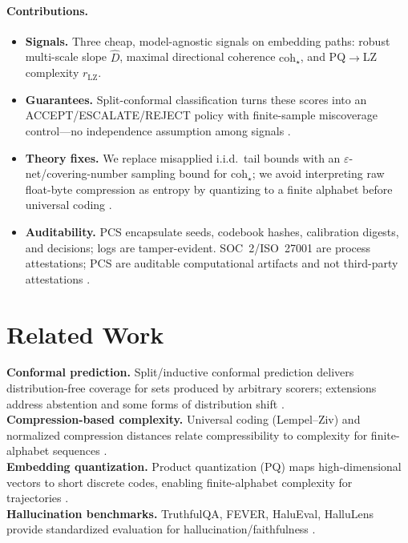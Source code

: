 \documentclass[11pt]{article}
\begin{document}
\paragraph{Contributions.}
\begin{itemize}
  \item \textbf{Signals.} Three cheap, model-agnostic signals on embedding paths: robust multi-scale slope $\hat D$, maximal directional coherence $\mathrm{coh}_\star$, and PQ$\to$LZ complexity $r_{\mathrm{LZ}}$.
  \item \textbf{Guarantees.} Split-conformal classification turns these scores into an \textsc{ACCEPT}/\textsc{ESCALATE}/\textsc{REJECT} policy with finite-sample miscoverage control---no independence assumption among signals \citep{angelopoulos2023gentle,oliveira2024nonexchangeable}.
  \item \textbf{Theory fixes.} We replace misapplied i.i.d.\ tail bounds with an $\varepsilon$-net/covering-number sampling bound for $\mathrm{coh}_\star$; we avoid interpreting raw float-byte compression as entropy by quantizing to a finite alphabet before universal coding \citep{vershynin2018hdp,ziv1978}.
  \item \textbf{Auditability.} PCS encapsulate seeds, codebook hashes, calibration digests, and decisions; logs are tamper-evident. SOC~2/ISO~27001 are process attestations; PCS are auditable computational artifacts and not third-party attestations \citep{aicpa-soc2}.
\end{itemize}

\section{Related Work}
\textbf{Conformal prediction.} Split/inductive conformal prediction delivers distribution-free coverage for sets produced by arbitrary scorers; extensions address abstention and some forms of distribution shift \citep{angelopoulos2023gentle,shafer2008tutorial}.\\
\textbf{Compression-based complexity.} Universal coding (Lempel--Ziv) and normalized compression distances relate compressibility to complexity for finite-alphabet sequences \citep{ziv1978,shannon1948}.\\
\textbf{Embedding quantization.} Product quantization (PQ) maps high-dimensional vectors to short discrete codes, enabling finite-alphabet complexity for trajectories \citep{jegou2011}.\\
\textbf{Hallucination benchmarks.} TruthfulQA, FEVER, HaluEval, HalluLens provide standardized evaluation for hallucination/faithfulness \citep{lin2022truthfulqa,thorne2018fever}.
\end{document}

